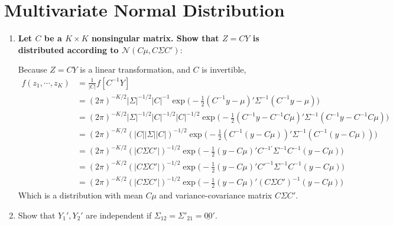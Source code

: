 \documentclass{article}[12pt]
\begin{document}
\section{Multivariate Normal Distribution}
	\begin{enumerate}
		\item \textbf{Let $C$ be a $K \times K$ nonsingular matrix. Show that $Z = CY$ is distributed according to $\mathscr{N} (C \mu,C \Sigma C')$}:

		Because $Z = CY$ is a linear transformation, and $C$ is invertible,
		\begin{align*}
			f(z_1, \cdots, z_K) &= \frac{1}{|C|} f[C^{-1}Y] \\
			&= (2 \pi)^{-K/2} |\Sigma|^{-1/2} |C|^{-1} \exp \bigg( -\frac{1}{2}(C^{-1}y - \mu)' \Sigma^{-1} (C^{-1}y - \mu) \bigg) \\
			&= (2 \pi)^{-K/2} |\Sigma|^{-1/2} |C|^{-1/2} |C|^{-1/2} \exp \bigg( -\frac{1}{2}(C^{-1}y - C^{-1}C\mu)' \Sigma^{-1} (C^{-1}y - C^{-1}C\mu) \bigg) \\
			&= (2 \pi)^{-K/2} (|C||\Sigma||C|)^{-1/2} \exp \bigg( -\frac{1}{2}(C^{-1}(y - C\mu))' \Sigma^{-1} (C^{-1}(y - C\mu)) \bigg) \\
			&= (2 \pi)^{-K/2} (|C\Sigma C'|)^{-1/2} \exp \bigg( -\frac{1}{2}(y - C\mu)' C^{-1'} \Sigma^{-1} C^{-1}(y - C\mu) \bigg) \\
			&= (2 \pi)^{-K/2} (|C\Sigma C'|)^{-1/2} \exp \bigg( -\frac{1}{2}(y - C\mu)' C'^{-1} \Sigma^{-1} C^{-1}(y - C\mu) \bigg) \\
			&= (2 \pi)^{-K/2} (|C\Sigma C'|)^{-1/2} \exp \bigg( -\frac{1}{2}(y - C\mu)' (C \Sigma C')^{-1}(y - C\mu) \bigg)
		\end{align*}
		Which is a distribution with mean $C\mu$ and variance-covariance matrix $C\Sigma C'$.

		\item Show that $Y_1', Y_2'$ are independent if $\Sigma_{12} = \Sigma'_{21} = \underline{00}'$.


\end{enumerate}
\end{document}
